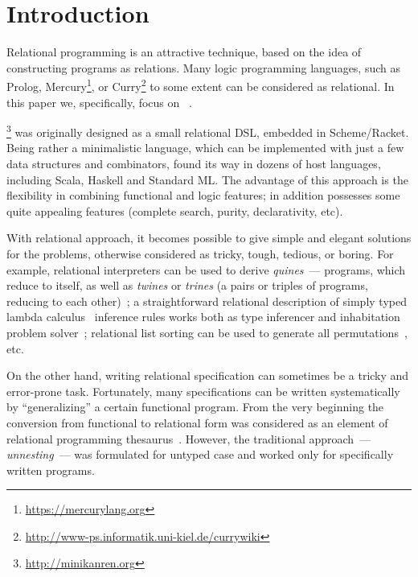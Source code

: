 \section{Introduction}
\label{intro}

Relational programming is an attractive technique, based on the idea of constructing programs as relations.
Many logic programming languages, such as Prolog, Mercury\footnote{\url{https://mercurylang.org}}, 
or Curry\footnote{\url{http://www-ps.informatik.uni-kiel.de/currywiki}} to some extent can be considered as relational. 
In this paper we, specifically, focus on \miniKanren~\cite{TRS}. 

\miniKanren\footnote{\url{http://minikanren.org}} was originally designed as a small relational DSL, embedded in Scheme/Racket. 
Being rather a minimalistic language, which can be implemented with just a few data structures and combinators, \miniKanren found 
its way in dozens of host languages, including Scala, Haskell and Standard ML. The advantage of this approach is the flexibility in
combining functional and logic features; in addition \miniKanren possesses some quite appealing features (complete search, purity, 
declarativity, etc).

With relational approach, it becomes possible to give simple and elegant solutions for the problems, otherwise
considered as tricky, tough, tedious, or boring. For example, relational interpreters can be used to derive
\emph{quines}~--- programs, which reduce to itself, as well as \emph{twines} or \emph{trines} (a pairs or triples of
programs, reducing to each other)~\cite{Untagged}; a straightforward relational description of
simply typed lambda calculus~\cite{Lambda} inference rules works both as type inferencer and inhabitation problem solver~\cite{WillThesis};
relational list sorting can be used to generate all permutations~\cite{ocanren}, etc. 

On the other hand, writing relational specification can sometimes be a tricky and error-prone task. Fortunately, many 
specifications can be written systematically by ``generalizing'' a certain functional program. From the very beginning 
the conversion from functional to relational form was considered as an element of relational programming thesaurus~\cite{TRS}. However,
the traditional approach~--- \emph{unnesting}~--- was formulated for untyped case and worked only for specifically written
programs.

